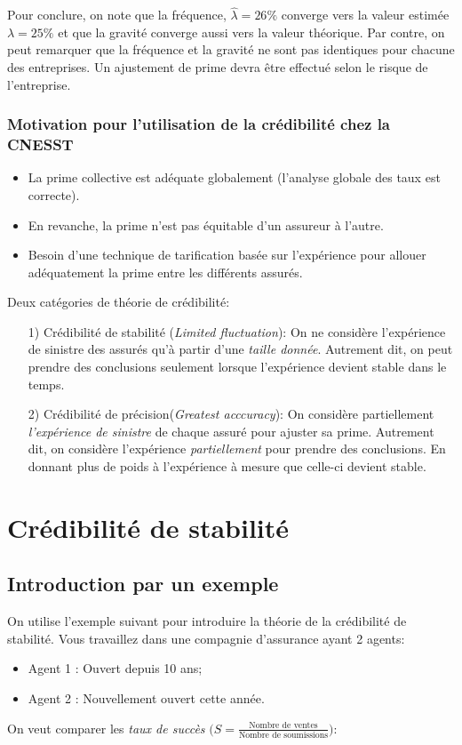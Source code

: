 \documentclass[11pt,french]{report}
\begin{document}
Pour conclure, on note que la fréquence, $\widehat{\lambda} = 26\% $ converge vers la valeur estimée $\lambda = 25 \%$ et que la gravité converge aussi vers la valeur théorique.
Par contre, on peut remarquer que la fréquence et la gravité ne sont pas identiques pour chacune des entreprises. Un ajustement de prime devra être effectué selon le risque de l'entreprise.
\\
\subsection*{Motivation pour l'utilisation de la crédibilité chez la CNESST}
\begin{itemize}
\item La prime collective est adéquate globalement (l'analyse globale des taux est correcte).
\item En revanche, la prime n'est pas équitable d'un assureur à l'autre.
\item Besoin d'une technique de tarification basée sur l'expérience pour allouer adéquatement la prime entre les différents assurés.
\end{itemize}
\bigskip

Deux catégories de théorie de crédibilité:
\begin{itemize}
\item[1)]Crédibilité de stabilité (\textit{Limited fluctuation}): On ne considère l'expérience de sinistre des assurés qu'à partir d'une \emph{\textit{taille} donnée}. Autrement dit, on peut prendre des conclusions seulement lorsque l'expérience devient stable dans le temps.\\

\item[2)]Crédibilité de précision(\textit{Greatest acccuracy}): On considère partiellement \emph{l'expérience de sinistre} de chaque assuré pour ajuster sa prime. Autrement dit, on considère l'expérience \emph{partiellement} pour prendre des conclusions. En donnant plus de poids à l'expérience à mesure que celle-ci devient stable.
\end{itemize}



\chapter{Crédibilité de stabilité}
\section{Introduction par un exemple}
\label{chap:intro:ex}
On utilise l'exemple suivant pour introduire la théorie de la crédibilité de stabilité.
Vous travaillez dans une compagnie d'assurance ayant 2 agents:
\begin{itemize}
\item Agent 1 : Ouvert depuis 10 ans;
\item Agent 2 : Nouvellement ouvert cette année.
\end{itemize}
On veut comparer les \textit{taux de succès} $\Big(S = \frac{\text{Nombre de ventes}}{\text{Nombre de soumissions}}\Big)$:
\end{document}
